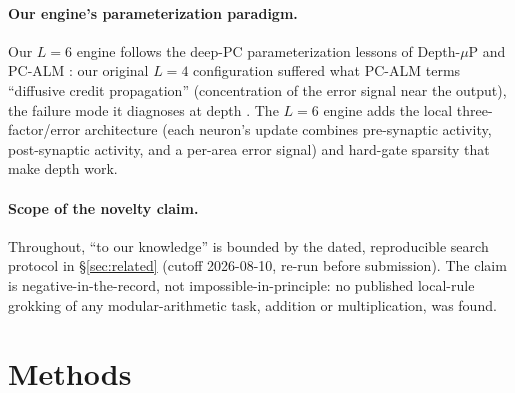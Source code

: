 \documentclass[11pt]{article}
\begin{document}
\paragraph{Our engine's parameterization paradigm.}
Our $L=6$ engine follows the deep-PC parameterization lessons of Depth-$\mu$P \cite{innocenti2025} and PC-ALM \cite{seely2026}: our original $L=4$ configuration suffered what PC-ALM terms ``diffusive credit propagation'' (concentration of the error signal near the output), the failure mode it diagnoses at depth \cite{seely2026}. The $L=6$ engine adds the local three-factor/error architecture (each neuron's update combines pre-synaptic activity, post-synaptic activity, and a per-area error signal) and hard-gate sparsity that make depth work.

\paragraph{Scope of the novelty claim.}
Throughout, ``to our knowledge'' is bounded by the dated, reproducible search protocol in \S\ref{sec:related} (cutoff 2026-08-10, re-run before submission). The claim is negative-in-the-record, not impossible-in-principle: no published local-rule grokking of any modular-arithmetic task, addition or multiplication, was found.

\section{Methods}\label{sec:methods}
\end{document}
